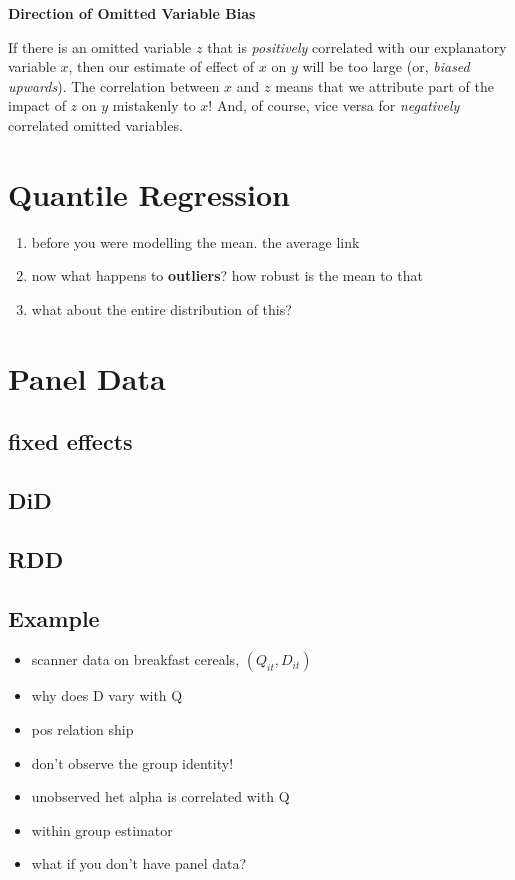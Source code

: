 \documentclass[]{book}
\providecommand{\tightlist}{%
  \setlength{\itemsep}{0pt}\setlength{\parskip}{0pt}}
\newenvironment{note}{\begin{tcolorbox}[colback=blue!5!white,colframe=blue!75!black,title=\textbf{Note:}]}{\end{tcolorbox}}
\theoremstyle{definition}
\theoremstyle{definition}
\theoremstyle{definition}
\theoremstyle{remark}
\begin{document}
\begin{note}
\textbf{Direction of Omitted Variable Bias}

If there is an omitted variable \(z\) that is \emph{positively}
correlated with our explanatory variable \(x\), then our estimate of
effect of \(x\) on \(y\) will be too large (or, \emph{biased upwards}).
The correlation between \(x\) and \(z\) means that we attribute part of
the impact of \(z\) on \(y\) mistakenly to \(x\)! And, of course, vice
versa for \emph{negatively} correlated omitted variables.
\end{note}

\chapter{Quantile Regression}\label{quantreg}

\begin{enumerate}
\def\labelenumi{\arabic{enumi}.}
\tightlist
\item
  before you were modelling the mean. the average link
\item
  now what happens to \textbf{outliers}? how robust is the mean to that
\item
  what about the entire distribution of this?
\end{enumerate}

\chapter{Panel Data}\label{panel-data}

\section{fixed effects}\label{fixed-effects}

\section{DiD}\label{did}

\section{RDD}\label{rdd}

\section{Example}\label{example}

\begin{itemize}
\tightlist
\item
  scanner data on breakfast cereals, \((Q_{it},D_{it})\)
\item
  why does D vary with Q
\item
  pos relation ship
\item
  don't observe the group identity!
\item
  unobserved het alpha is correlated with Q
\item
  within group estimator
\item
  what if you don't have panel data?
\end{itemize}
\end{document}
